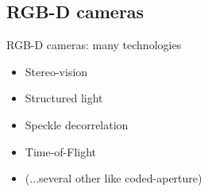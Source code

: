 \documentclass[compress]{beamer}
\begin{document}
\subsection{RGB-D cameras}

\begin{frame}{RGB-D cameras: many technologies}
    \begin{itemize}
        \item Stereo-vision
        \item Structured light
        \item Speckle decorrelation
        \item Time-of-Flight
        \item (...several other like coded-aperture)
    \end{itemize}
\end{frame}


\end{document}
